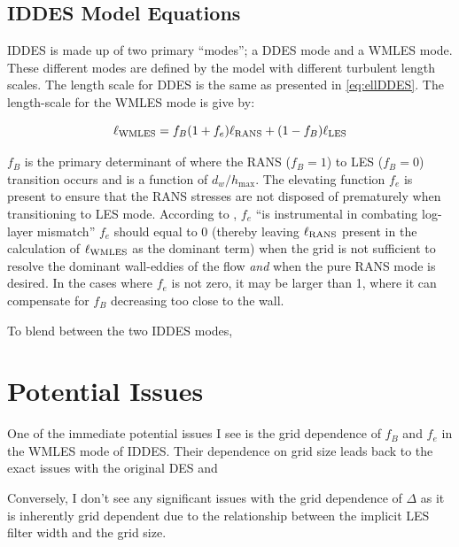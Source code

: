 \documentclass{ucb}
\newcommand{\WMLES}{\textup{WMLES}}
\newcommand{\RANS}{\textup{RANS}}
\newcommand{\LES}{\textup{LES}}
\begin{document}

\subsection{IDDES Model Equations}
IDDES is made up of two primary ``modes''; a DDES mode and a WMLES mode. These different modes are defined by the model with different turbulent length scales. The length scale for DDES is the same as presented in \cref{eq:ellDDES}.
The length-scale for the WMLES mode is give by:

\begin{equation}\label{eq:ellIDDES}
    \ell_\WMLES = f_B (1+f_e) \ell_\RANS + (1-f_B)\ell_\LES
\end{equation}

\(f_B \) is the primary determinant of where the RANS (\(f_B =1\)) to LES (\(f_B = 0\)) transition occurs and is a function of \(d_w / h_{\max} \).
The elevating function \(f_e \) is present to ensure that the RANS stresses are not disposed of prematurely when transitioning to LES mode. According to \citeauthor{shurHybridRANSLESApproach2008}, \(f_e \) ``is instrumental in combating log-layer mismatch'' \cite{shurHybridRANSLESApproach2008} \(f_e \) should equal to 0 (thereby leaving \(\ell_\RANS \) present in the calculation of \(\ell_\WMLES \) as the dominant term) when the grid is not sufficient to resolve the dominant wall-eddies of the flow \textit{and} when the pure RANS mode is desired. In the cases where \(f_e \) is not zero, it may be larger than 1, where it can compensate for \(f_B \) decreasing too close to the wall.

To blend between the two IDDES modes, 




\section{Potential Issues}
One of the immediate potential issues I see is the grid dependence of \(f_B \) and \(f_e \) in the WMLES mode of IDDES. Their dependence on grid size leads back to the exact issues with the original DES and 
    
Conversely, I don't see any significant issues with the grid dependence of \(\Delta \) as it is inherently grid dependent due to the relationship between the implicit LES filter width and the grid size. 

\ucbbib{}
    
\end{document}
